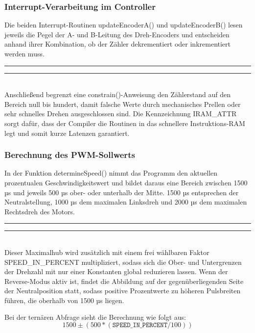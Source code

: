 \documentclass[a4paper,12pt]{article}
\begin{document}
\subsubsection{Interrupt-Verarbeitung im Controller}
Die beiden Interrupt-Routinen updateEncoderA() und updateEncoderB() lesen jeweils die Pegel der A- und B-Leitung des Dreh-Encoders und entscheiden anhand ihrer Kombination, ob der Zähler dekrementiert oder inkrementiert werden muss. 
\newline\noindent\rule{\linewidth}{0.4pt}  %

\noindent\rule{\linewidth}{0.4pt}\\[0.5em]  %
Anschließend begrenzt eine constrain()-Anweisung den Zählerstand auf den Bereich null bis hundert, damit falsche Werte durch mechanisches Prellen oder sehr schnelles Drehen ausgeschlossen sind. Die Kennzeichnung IRAM\_ATTR sorgt dafür, dass der Compiler die Routinen in das schnellere Instruktions-RAM legt und somit kurze Latenzen garantiert.

\subsubsection{Berechnung des PWM-Sollwerts}
In der Funktion determineSpeed() nimmt das Programm den aktuellen prozentualen Geschwindigkeitswert und bildet daraus eine Bereich zwischen 1500 µs und jeweils 500 µs ober- oder unterhalb der Mitte. 1500 µs entsprechen der Neutralstellung, 1000 µs dem maximalen Linksdreh und 2000 µs dem maximalen Rechtsdreh des Motors.
\newline\noindent\rule{\linewidth}{0.4pt}  %

\noindent\rule{\linewidth}{0.4pt}\\[0.5em]  %
Dieser Maximalhub wird zusätzlich mit einem frei wählbaren Faktor SPEED\_IN\_PERCENT multipliziert, sodass sich die Ober- und Untergrenzen der Drehzahl mit nur einer Konstanten global reduzieren lassen. Wenn der Reverse-Modus aktiv ist, findet die Abbildung auf der gegenüberliegenden Seite der Neutralposition statt, sodass positive Prozentwerte zu höheren Pulsbreiten führen, die oberhalb von 1500 µs liegen. \newline

Bei der ternären Abfrage sieht die Berechnung wie folgt aus:
\begin{equation}
    1500 \pm (500*(\texttt{SPEED\_IN\_PERCENT}/100))
\end{equation}
\end{document}
